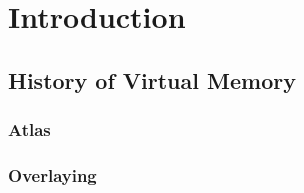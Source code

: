 \chapter{Introduction} %

\label{Intro}


\section{History of Virtual Memory}
\subsection{Atlas}
\subsection{Overlaying}
